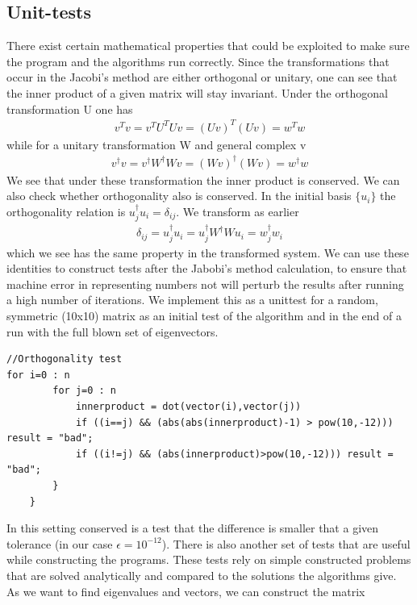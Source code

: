 \documentclass[a4paper,11pt]{article}
\begin{document}
{\subsection{Unit-tests}
There exist certain mathematical properties that could be exploited to make sure the program and the algorithms run correctly. Since the transformations that occur in the Jacobi's method are either orthogonal or unitary, one can see that the inner product of a given matrix will stay invariant. Under the orthogonal transformation U one has
\begin{align}
	v^{T}v = v^T U^T U v = (Uv)^T (Uv) = w^T w
\end{align}
while for a unitary transformation W and general complex v
\begin{align}
	v^\dagger v = v^\dagger W^\dagger W v = (Wv)^\dagger (Wv) = w^\dagger w
\end{align}
We see that under these transformation the inner product is conserved. We can also check whether orthogonality also is conserved. In the initial basis $\{u_i\}$ the orthogonality relation is $u_j^\dagger u_i = \delta_{ij}$. We transform as earlier
\begin{align}
	 \delta_{ij}=u_j^\dagger u_i = u_j^\dagger W^\dagger W u_i = w_j^\dagger w_i
\end{align}
which we see has the same property in the transformed system. We can use these identities to construct tests after the Jabobi's method calculation, to ensure that machine error in representing numbers not will perturb the results after running a high number of iterations. We implement this as a unittest for a random, symmetric (10x10) matrix as an initial test of the algorithm and in the end of a run with the full blown set of eigenvectors. 
\begin{lstlisting}
//Orthogonality test   
for i=0 : n
        for j=0 : n
            innerproduct = dot(vector(i),vector(j))
            if ((i==j) && (abs(abs(innerproduct)-1) > pow(10,-12))) result = "bad";
            if ((i!=j) && (abs(innerproduct)>pow(10,-12))) result = "bad";
        }
    }
\end{lstlisting}
In this setting conserved is a test that the difference is smaller that a given tolerance (in our case $\epsilon = 10^{-12}$). There is also another set of tests that are useful while constructing the programs. These tests rely on simple constructed problems that are solved analytically and compared to the solutions the algorithms give. As we want to find eigenvalues and vectors, we can construct the matrix 
}
\end{document}
